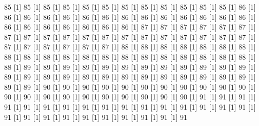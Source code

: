 \documentclass[12pt]{article}
\begin{document}
\begin{Schunk}
\begin{Soutput}
[1] 85%
[1] 85%
[1] 85%
[1] 85%
[1] 85%
[1] 85%
[1] 85%
[1] 85%
[1] 85%
[1] 85%
[1] 85%
[1] 85%
[1] 86%
[1] 86%
[1] 86%
[1] 86%
[1] 86%
[1] 86%
[1] 86%
[1] 86%
[1] 86%
[1] 86%
[1] 86%
[1] 86%
[1] 86%
[1] 86%
[1] 86%
[1] 86%
[1] 86%
[1] 86%
[1] 86%
[1] 86%
[1] 86%
[1] 87%
[1] 87%
[1] 87%
[1] 87%
[1] 87%
[1] 87%
[1] 87%
[1] 87%
[1] 87%
[1] 87%
[1] 87%
[1] 87%
[1] 87%
[1] 87%
[1] 87%
[1] 87%
[1] 87%
[1] 87%
[1] 87%
[1] 87%
[1] 87%
[1] 87%
[1] 87%
[1] 87%
[1] 87%
[1] 88%
[1] 88%
[1] 88%
[1] 88%
[1] 88%
[1] 88%
[1] 88%
[1] 88%
[1] 88%
[1] 88%
[1] 88%
[1] 88%
[1] 88%
[1] 88%
[1] 88%
[1] 88%
[1] 88%
[1] 88%
[1] 88%
[1] 88%
[1] 88%
[1] 89%
[1] 89%
[1] 89%
[1] 89%
[1] 89%
[1] 89%
[1] 89%
[1] 89%
[1] 89%
[1] 89%
[1] 89%
[1] 89%
[1] 89%
[1] 89%
[1] 89%
[1] 89%
[1] 89%
[1] 89%
[1] 89%
[1] 89%
[1] 89%
[1] 89%
[1] 89%
[1] 89%
[1] 89%
[1] 89%
[1] 89%
[1] 90%
[1] 90%
[1] 90%
[1] 90%
[1] 90%
[1] 90%
[1] 90%
[1] 90%
[1] 90%
[1] 90%
[1] 90%
[1] 90%
[1] 90%
[1] 90%
[1] 90%
[1] 90%
[1] 90%
[1] 90%
[1] 90%
[1] 90%
[1] 90%
[1] 91%
[1] 91%
[1] 91%
[1] 91%
[1] 91%
[1] 91%
[1] 91%
[1] 91%
[1] 91%
[1] 91%
[1] 91%
[1] 91%
[1] 91%
[1] 91%
[1] 91%
[1] 91%
[1] 91%
[1] 91%
[1] 91%
[1] 91%
[1] 91%
[1] 91%
[1] 91%
[1] 91%
[1] 91%
[1] 91%

\end{Soutput}
\end{Schunk}
\end{document}
